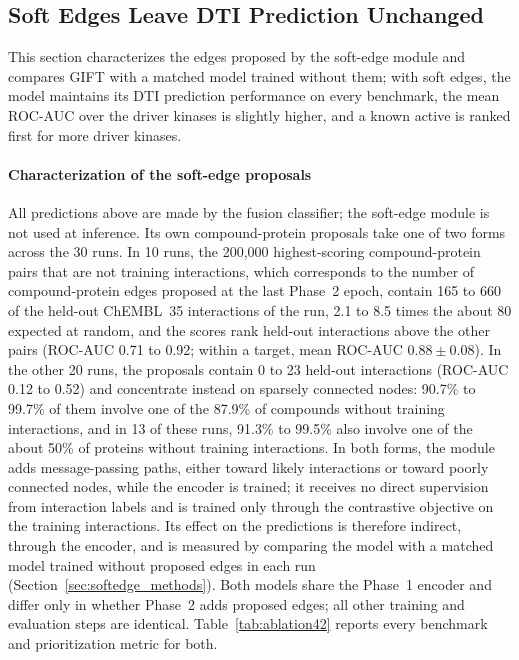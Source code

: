 \documentclass[11pt,letterpaper]{article}
\begin{document}
\subsection{Soft Edges Leave DTI Prediction Unchanged}
\label{sec:ablation42}

This section characterizes the edges proposed by the soft-edge module and compares GIFT with a matched model trained without them; with soft edges, the model maintains its DTI prediction performance on every benchmark, the mean ROC-AUC over the driver kinases is slightly higher, and a known active is ranked first for more driver kinases.

\paragraph{Characterization of the soft-edge proposals}
All predictions above are made by the fusion classifier; the soft-edge module is not used at inference. Its own compound-protein proposals take one of two forms across the 30 runs. In 10 runs, the 200,000 highest-scoring compound-protein pairs that are not training interactions, which corresponds to the number of compound-protein edges proposed at the last Phase~2 epoch, contain 165 to 660 of the held-out ChEMBL~35 interactions of the run, 2.1 to 8.5 times the about 80 expected at random, and the scores rank held-out interactions above the other pairs (ROC-AUC 0.71 to 0.92; within a target, mean ROC-AUC $0.88\pm0.08$). In the other 20 runs, the proposals contain 0 to 23 held-out interactions (ROC-AUC 0.12 to 0.52) and concentrate instead on sparsely connected nodes: 90.7\% to 99.7\% of them involve one of the 87.9\% of compounds without training interactions, and in 13 of these runs, 91.3\% to 99.5\% also involve one of the about 50\% of proteins without training interactions. In both forms, the module adds message-passing paths, either toward likely interactions or toward poorly connected nodes, while the encoder is trained; it receives no direct supervision from interaction labels and is trained only through the contrastive objective on the training interactions. Its effect on the predictions is therefore indirect, through the encoder, and is measured by comparing the model with a matched model trained without proposed edges in each run (Section~\ref{sec:softedge_methods}). Both models share the Phase~1 encoder and differ only in whether Phase~2 adds proposed edges; all other training and evaluation steps are identical. Table~\ref{tab:ablation42} reports every benchmark and prioritization metric for both.
\end{document}
